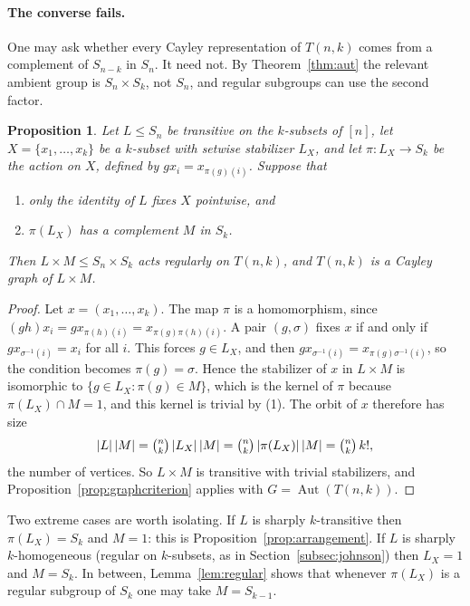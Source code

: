 \documentclass[12pt,letterpaper]{article}
\numberwithin{equation}{section}
\newtheorem{proposition}[theorem]{Proposition}
\theoremstyle{definition}
\DeclareMathOperator{\autt}{Aut}
\begin{document}
\paragraph{The converse fails.} One may ask whether every Cayley representation of $T(n,k)$ comes from a complement of $S_{n-k}$ in $S_n$. It need not. By Theorem~\ref{thm:aut} the relevant ambient group is $S_n\times S_k$, not $S_n$, and regular subgroups can use the second factor.
\begin{proposition}\label{prop:lifting}
Let $L\leq S_n$ be transitive on the $k$-subsets of $[n]$, let $X=\{x_1,\ldots,x_k\}$ be a $k$-subset with setwise stabilizer $L_X$, and let $\pi\colon L_X\to S_k$ be the action on $X$, defined by $gx_i=x_{\pi(g)(i)}$. Suppose that
\begin{enumerate}
\item only the identity of $L$ fixes $X$ pointwise, and
\item $\pi(L_X)$ has a complement $M$ in $S_k$.
\end{enumerate}
Then $L\times M\leq S_n\times S_k$ acts regularly on $T(n,k)$, and $T(n,k)$ is a Cayley graph of $L\times M$.
\end{proposition}
\begin{proof}
Let $x=(x_1,\ldots,x_k)$. The map $\pi$ is a homomorphism, since $(gh)x_i=gx_{\pi(h)(i)}=x_{\pi(g)\pi(h)(i)}$. A pair $(g,\sigma)$ fixes $x$ if and only if $gx_{\sigma^{-1}(i)}=x_i$ for all $i$. This forces $g\in L_X$, and then $gx_{\sigma^{-1}(i)}=x_{\pi(g)\sigma^{-1}(i)}$, so the condition becomes $\pi(g)=\sigma$. Hence the stabilizer of $x$ in $L\times M$ is isomorphic to $\{g\in L_X:\pi(g)\in M\}$, which is the kernel of $\pi$ because $\pi(L_X)\cap M=1$, and this kernel is trivial by (1). The orbit of $x$ therefore has size
\[
|L|\,|M|=\tbinom nk\,|L_X|\,|M|=\tbinom nk\,|\pi(L_X)|\,|M|=\tbinom nk\,k!,
\]
the number of vertices. So $L\times M$ is transitive with trivial stabilizers, and Proposition~\ref{prop:graphcriterion} applies with $G=\autt(T(n,k))$.
\end{proof}
Two extreme cases are worth isolating. If $L$ is sharply $k$-transitive then $\pi(L_X)=S_k$ and $M=1$: this is Proposition~\ref{prop:arrangement}. If $L$ is sharply $k$-homogeneous (regular on $k$-subsets, as in Section~\ref{subsec:johnson}) then $L_X=1$ and $M=S_k$. In between, Lemma~\ref{lem:regular} shows that whenever $\pi(L_X)$ is a regular subgroup of $S_k$ one may take $M=S_{k-1}$.
\end{document}
